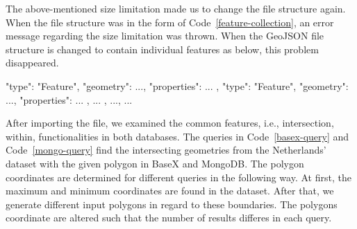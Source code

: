 \documentclass[a4paper,12pt]{article}
\begin{document}
The above-mentioned size limitation made us to change the file structure again.
When the file structure was in the form of Code~\ref{feature-collection}, 
an error message regarding the size limitation was thrown. 
When the GeoJSON file structure is changed to contain individual features as below,
this problem disappeared.
\vspace{10px}
\begin{fakeXML}[label=features,caption=A GeoJSON file restructured regarding the size limitation]
    {
      "type": "Feature",
      "geometry": {...},
      "properties": {...}
    },
    {
      "type": "Feature",
      "geometry": {...},
      "properties": {...}
    }, 
    { ... }, ..., { ... }
\end{fakeXML}
\vspace{10px}
After importing the file, we examined the common features, i.e., intersection, within, 
functionalities in both databases.
The queries in Code~\ref{basex-query} and Code~\ref{mongo-query} find the intersecting geometries from the Netherlands' dataset with the given polygon in BaseX and MongoDB. The polygon coordinates are determined for different queries in the following way. At first, the maximum and minimum coordinates are found in the dataset. After that, we generate different input polygons in regard to these boundaries. The polygons coordinate are altered such that the number of results differes in each query.
\vspace{10px}
\vspace{10px}
\end{document}
